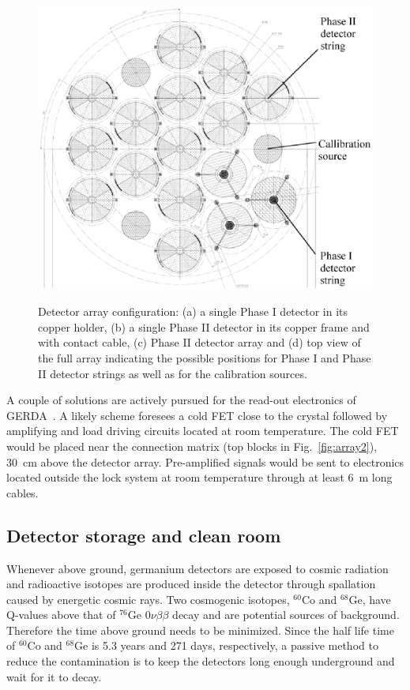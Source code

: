 \begin{figure}[tbhp]
{    \includegraphics[height=0.23\textheight]{arrayTop}}%
  \caption{Detector array configuration: (a) a single Phase I detector     in its copper holder, (b) a single Phase II detector in its copper     frame and with contact cable, (c) Phase II detector array and (d)     top view of the full array indicating the possible positions for     Phase I and Phase II detector strings as well as for the     calibration sources.}
  \label{fig:array}
\end{figure}

A couple of solutions are actively pursued for the read-out electronics of GERDA~\cite{Cat07}. A likely scheme foresees a cold FET close to the crystal followed by amplifying and load driving circuits located at room temperature. The cold FET would be placed near the connection matrix (top blocks in Fig.~\ref{fig:array2}), 30~cm above the detector array. Pre-amplified signals would be sent to electronics located outside the lock system at room temperature through at least 6~m long cables.

\subsection{Detector storage and clean room}
\label{sec:gerda:source}
Whenever above ground, germanium detectors are exposed to cosmic radiation and radioactive isotopes are produced inside the detector through spallation caused by energetic cosmic rays. Two cosmogenic isotopes, $^{60}$Co and $^{68}$Ge, have Q-values above that of $^{76}$Ge $0\nu\beta\beta$ decay and are potential sources of background. Therefore the time above ground needs to be minimized. Since the half life time of $^{60}$Co and $^{68}$Ge is 5.3 years and 271 days, respectively, a passive method to reduce the contamination is to keep the detectors long enough underground and wait for it to decay.


